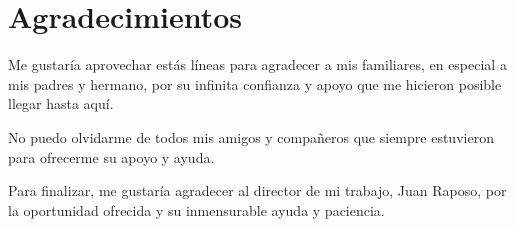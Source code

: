 \newpage
\chapter*{Agradecimientos}
\setcounter{page}{1}

Me gustaría aprovechar estás líneas para agradecer a mis familiares, en especial a mis padres y hermano, por su infinita confianza y apoyo que me hicieron posible llegar hasta aquí.

No puedo olvidarme de todos mis amigos y compañeros que siempre estuvieron para ofrecerme su apoyo y ayuda.

Para finalizar, me gustaría agradecer al director de mi trabajo, Juan Raposo, por la oportunidad ofrecida y su inmensurable ayuda y paciencia. 